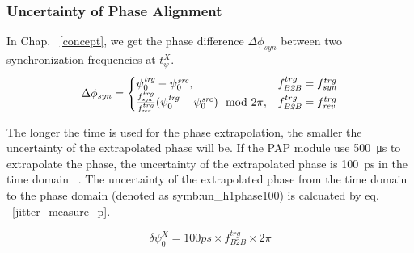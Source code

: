 
\subsubsection{Uncertainty of Phase Alignment}

In Chap. ~\ref{concept}, we get the phase difference $\Delta \phi_\mathit{syn}$ between two synchronization frequencies at $t_\psi^X$.
\begin{eqnarray}\label{phase_syn}
\Delta \phi_\mathit{syn}=
\begin{cases}
\psi^\mathit{trg}_0-\psi^\mathit{src}_0, &f_{\mathit{B2B}}^{trg}=f_{\mathit{syn}}^{trg}\cr
\frac{f_{\mathit{syn}}^{trg}}{f_{\mathit{rev}}^{trg}}(\psi^\mathit{trg}_0-\psi^\mathit{src}_0) \mod 2\pi, &f_{\mathit{B2B}}^{trg}=f_{\mathit{rev}}^{trg}\cr
\end{cases}
\end{eqnarray}

The longer the time is used for the phase extrapolation, the smaller the uncertainty of the extrapolated phase will be. If the PAP module use \SI{500}{\micro\second} to extrapolate the phase, the uncertainty of the extrapolated phase is \SI{100}{ps} in the time domain ~\cite{ferrand_development_????}. The uncertainty of the extrapolated phase from the time domain to the phase domain (denoted as \gls{symb:un_h1phase100}) is calcuated by eq. ~\ref{jitter_measure_p}.

\begin{equation} 
\delta \psi^{X}_0=100ps \times f_\mathit{B2B}^\mathit{trg} \times {2\pi}
\label{jitter_measure_p}
\end{equation}

